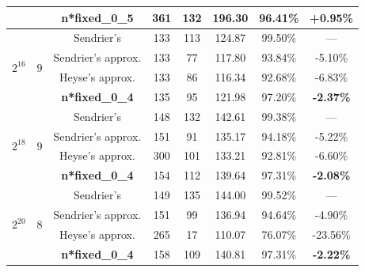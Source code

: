 \documentclass[10pt,journal,compsoc]{IEEEtran}
\begin{document}
\begin{table}[!tbh]
\begin{tabular}{cccccccc}
                            &                          &\textbf{n*fixed\_0\_5}             &361&132    &196.30   &96.41\%&\textbf{+0.95\%}\\

\hline
\multirow{4}{*}{$2^{16}$}    & \multirow{4}{*}{$9$}  &  Sendrier's\cite{sendrier2005encoding}           &133       &113    &124.87   &99.50\%& --- \\
                            &                          &Sendrier's approx.\cite{sendrier2005encoding}       &133 &77    &117.80 &93.84\% &-5.10\%\\
                            &                          &Heyse's approx.\cite{heyse2012towards}     &133       &86   &116.34  &92.68\%&-6.83\%\\

                            &                          &\textbf{n*fixed\_0\_4}            &135       &95    &121.98   &97.20\%&\textbf{-2.37\%}  \\

\hline
\multirow{4}{*}{$2^{18}$}    & \multirow{4}{*}{$9$}  &  Sendrier's\cite{sendrier2005encoding}           &148       &132    &142.61   &99.38\%&---\\
                            &                          &Sendrier's approx.\cite{sendrier2005encoding}       &151 &91    &135.17 &94.18\% &-5.22\%\\
                            &                          &Heyse's approx.\cite{heyse2012towards}     &300       &101    &133.21   &92.81\%&-6.60\%\\

                            &                          &\textbf{n*fixed\_0\_4}            &154       &112    &139.64   &97.31\%&\textbf{-2.08\%}\\

\hline
\multirow{4}{*}{$2^{20}$}    & \multirow{4}{*}{$8$}  &  Sendrier's\cite{sendrier2005encoding}           &149      &135    &144.00   &99.52\%&---\\
                            &                          &Sendrier's approx.\cite{sendrier2005encoding}       &151 &99    &136.94 &94.64\% &-4.90\%\\
                            &                          &Heyse's approx.\cite{heyse2012towards}     &265      &17     &110.07    &76.07\%&-23.56\%\\

                            &                          &\textbf{n*fixed\_0\_4}            &158  &109    &140.81   &97.31\%&\textbf{-2.22\%}\\

\hline
\end{tabular}
\end{table}
\end{document}
